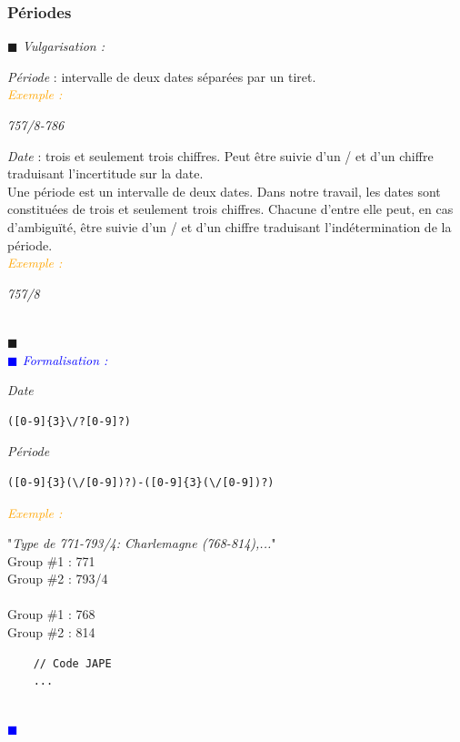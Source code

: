 \documentclass[a4paper, 11pt]{book}
\newenvironment{vulgarisation}
    {
    \textit{\textcolor{dark-blue}{$\blacksquare$  Vulgarisation : \\}}

    }
    {
    ~\\\textcolor{dark-blue}{$\blacksquare$}\\
    }
\newenvironment{formalisation}
    {
    \textit{\textcolor{blue}{$\blacksquare$  Formalisation : \\}}
    }
    {
    ~\\\textcolor{blue}{$\blacksquare$}\\
    }
\newenvironment{exemple}
    {
    \textit{\textcolor{orange}{
    Exemple : \\}}
    }
    {\\
    }
\begin{document}
\subsubsection{Périodes}
\begin{vulgarisation}
	\textit{Période} : intervalle de deux dates séparées par un tiret.\\
	\begin{exemple}
		\textit{757/8-786}
	\end{exemple}
	
	\textit{Date} : trois et seulement trois chiffres. Peut être suivie d'un \og/\fg{} et d'un chiffre traduisant l'incertitude sur la date.\\
	Une période est un intervalle de deux dates. Dans notre travail, les dates sont constituées de trois et seulement trois chiffres. Chacune d'entre elle peut, en cas d’ambiguïté, être suivie d'un \og/\fg{} et d'un chiffre traduisant l'indétermination de la période.\\
	\begin{exemple}
		\textit{757/8}
	\end{exemple}
	
\end{vulgarisation}
\begin{formalisation}
	\textit{Date}
	\begin{verbatim}
([0-9]{3}\/?[0-9]?)
	\end{verbatim}
	\textit{Période}
	\begin{verbatim}
([0-9]{3}(\/[0-9])?)-([0-9]{3}(\/[0-9])?)
	\end{verbatim}
	\begin{exemple}
		"\emph{Type de 771-793/4: Charlemagne (768-814),...}" \\
		Group \#1 : 771 \\
		Group \#2 : 793/4\\\\\noindent
		Group \#1 : 768 \\
		Group \#2 : 814
	\end{exemple}
	\begin{lstlisting}
	// Code JAPE
	...
	\end{lstlisting}
\end{formalisation}
\end{document}
